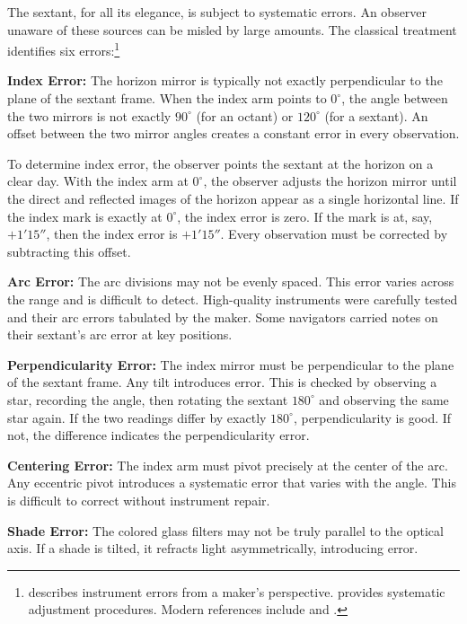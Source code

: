 The sextant, for all its elegance, is subject to systematic errors. An observer unaware of these sources can be misled by large amounts. The classical treatment identifies six errors:\footnote{\textcite{Ramsden1775} describes instrument errors from a maker's perspective. \textcite{Troughton1826} provides systematic adjustment procedures. Modern references include \textcite{Bauer1986} and \textcite{Ifland2005}.}

\textbf{Index Error:} The horizon mirror is typically not exactly perpendicular to the plane of the sextant frame. When the index arm points to $0^{\circ}$, the angle between the two mirrors is not exactly $90^{\circ}$ (for an octant) or $120^{\circ}$ (for a sextant). An offset between the two mirror angles creates a constant error in every observation.

To determine index error, the observer points the sextant at the horizon on a clear day. With the index arm at $0^{\circ}$, the observer adjusts the horizon mirror until the direct and reflected images of the horizon appear as a single horizontal line. If the index mark is exactly at $0^{\circ}$, the index error is zero. If the mark is at, say, $+1' 15''$, then the index error is $+1' 15''$. Every observation must be corrected by subtracting this offset.

\textbf{Arc Error:} The arc divisions may not be evenly spaced. This error varies across the range and is difficult to detect. High-quality instruments were carefully tested and their arc errors tabulated by the maker. Some navigators carried notes on their sextant's arc error at key positions.

\textbf{Perpendicularity Error:} The index mirror must be perpendicular to the plane of the sextant frame. Any tilt introduces error. This is checked by observing a star, recording the angle, then rotating the sextant $180^{\circ}$ and observing the same star again. If the two readings differ by exactly $180^{\circ}$, perpendicularity is good. If not, the difference indicates the perpendicularity error.

\textbf{Centering Error:} The index arm must pivot precisely at the center of the arc. Any eccentric pivot introduces a systematic error that varies with the angle. This is difficult to correct without instrument repair.

\textbf{Shade Error:} The colored glass filters may not be truly parallel to the optical axis. If a shade is tilted, it refracts light asymmetrically, introducing error.

